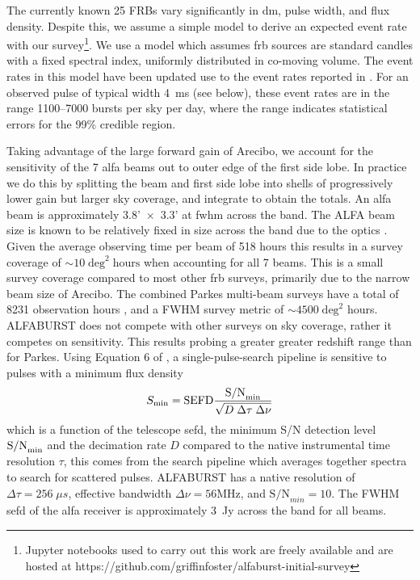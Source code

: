\documentclass[a4paper,fleqn,usenatbib]{mnras}
\begin{document}
The currently known 25 FRBs vary significantly in \gls{dm}, pulse width, and
flux density. Despite this, we assume a simple model to derive an expected event
rate with our survey\footnote{Jupyter notebooks used to carry out this work are
freely available and are hosted at
https://github.com/griffinfoster/alfaburst-initial-survey}.  We use a model
\citep[see equation 9 of][]{2013MNRAS.436L...5L} which assumes \gls{frb} sources
are standard candles with a fixed spectral index, uniformly distributed in
co-moving volume. The event rates in this model have been updated use to the
event rates reported in \cite{2016MNRAS.460.3370C}. For an observed pulse of
typical width 4~ms (see below), these event rates are in the range 1100--7000
bursts per sky per day, where the range indicates statistical errors for the
99\% credible region.

Taking advantage of the large forward gain of Arecibo, we account for the
sensitivity of the 7 \gls{alfa} beams out to outer edge of the first side lobe.
In practice we do this by splitting the beam and first side lobe into shells of
progressively lower gain but larger sky coverage, and integrate to obtain the
totals.  An \gls{alfa} beam is approximately 3.8'~$\times$~3.3' at \gls{fwhm}
across the band.  The ALFA beam size is known to be relatively fixed in size
across the band due to the optics \citep{GALFAbeam}.  Given the average
observing time per beam of 518 hours this results in a survey coverage of $\sim
10 \; \textrm{deg}^2 \; \textrm{hours}$ when accounting for all 7 beams. This is
a small survey coverage compared to most other \gls{frb} surveys, primarily due
to the narrow beam size of Arecibo. The combined Parkes multi-beam surveys have
a total of 8231 observation hours \citep{2016MNRAS.460.3370C}, and a FWHM survey
metric of $\sim 4500 \; \textrm{deg}^2$ hours.  ALFABURST does not compete with
other surveys on sky coverage, rather it competes on sensitivity. This results
probing a greater greater redshift range than for Parkes. Using Equation 6 of
\cite{2015MNRAS.452.1254K}, a  single-pulse-search pipeline is sensitive to
pulses with a minimum flux density
%
\begin{equation}
S_{\rm min} = \textrm{SEFD} \frac{\textrm{S/N}_{\rm min}}{\sqrt{D \; \Delta \tau \;
\Delta \nu}}
\end{equation}
%
which is a function of the telescope \gls{sefd}, the minimum S/N detection level
$\textrm{S/N}_{\rm min}$ and the decimation rate $D$ compared to the native
instrumental time resolution $\tau$, this comes from the search pipeline which
averages together spectra to search for scattered pulses. ALFABURST has a native
resolution of $\Delta \tau = 256 \; \mu s$, effective bandwidth $\Delta \nu = 56
\textrm{MHz}$, and $\textrm{S/N}_{min} = 10$. The FWHM \gls{sefd} of the
\gls{alfa} receiver is approximately 3~Jy across the band for all beams.
\end{document}
